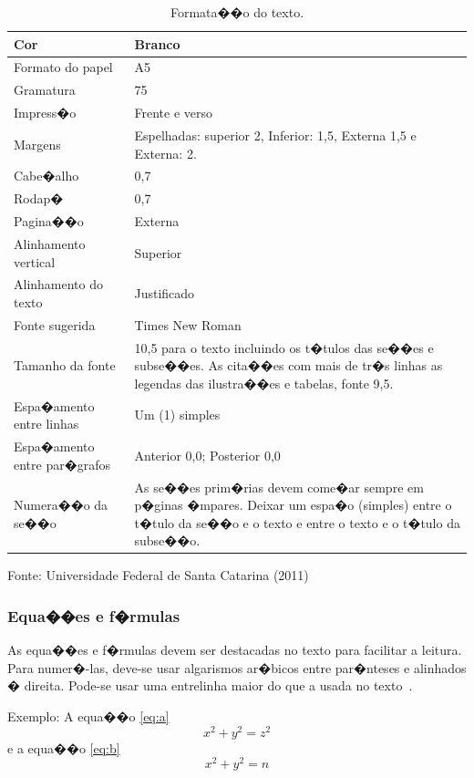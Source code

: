 \documentclass{ufscThesis} %
\begin{document}
\begin{table}[!htb]
\begin{center}
 \caption{Formata��o do texto.}
  \begin{tabular}{ p{3cm} | p{6cm} }
    \hline
Cor & Branco\\ \hline
Formato do papel & A5\\ \hline
Gramatura & 75\\ \hline
Impress�o & Frente e verso\\ \hline
Margens & Espelhadas: superior 2, Inferior: 1,5, Externa 1,5 e Externa: 2.\\ \hline
Cabe�alho & 0,7\\ \hline
Rodap� & 0,7\\ \hline
Pagina��o & Externa\\ \hline
Alinhamento vertical & Superior\\ \hline
Alinhamento do texto & Justificado\\ \hline
Fonte sugerida & Times New Roman \\ \hline
Tamanho da fonte & 10,5 para o texto incluindo os t�tulos das se��es e subse��es. As cita��es com mais de tr�s linhas as legendas das ilustra��es e tabelas, fonte 9,5.\\ \hline
Espa�amento entre linhas & Um (1) simples\\ \hline
Espa�amento entre par�grafos & Anterior 0,0; Posterior 0,0\\ \hline
Numera��o da se��o & As se��es  prim�rias devem  come�ar  sempre em p�ginas �mpares. Deixar um espa�o (simples) entre o t�tulo da se��o e o texto e  entre o texto e o t�tulo da subse��o. \\  \hline
  \end{tabular}
\end{center}
Fonte: Universidade Federal de Santa Catarina (2011)
\label{tab:a}
\end{table}



\subsubsection{Equa��es e f�rmulas}

As equa��es e f�rmulas devem ser destacadas no texto para facilitar a leitura.  Para numer�-las, deve-se usar algarismos ar�bicos entre par�nteses e alinhados � direita. Pode-se usar uma entrelinha maior do que a usada no texto~\cite{abnt14724}.

Exemplo: A equa��o \ref{eq:a}
\begin{equation}
 x^2 + y^2 = z^2
 \label{eq:a}
\end{equation}
 e a equa��o  \ref{eq:b}
\begin{equation}
 x^2 + y^2 = n
\label{eq:b}
\end{equation}
\end{document}

